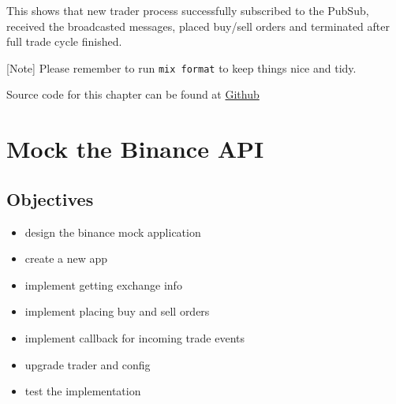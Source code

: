 \documentclass[
  oneside]{book}
\newenvironment{Shaded}{\begin{snugshade}}{\end{snugshade}}
\newcommand{\AttributeTok}[1]{\textcolor[rgb]{0.77,0.63,0.00}{#1}}
\newcommand{\CommentTok}[1]{\textcolor[rgb]{0.56,0.35,0.01}{\textit{#1}}}
\newcommand{\ErrorTok}[1]{\textcolor[rgb]{0.64,0.00,0.00}{\textbf{#1}}}
\newcommand{\ExtensionTok}[1]{#1}
\newcommand{\KeywordTok}[1]{\textcolor[rgb]{0.13,0.29,0.53}{\textbf{#1}}}
\newcommand{\NormalTok}[1]{#1}
\newcommand{\OperatorTok}[1]{\textcolor[rgb]{0.81,0.36,0.00}{\textbf{#1}}}
\newcommand{\StringTok}[1]{\textcolor[rgb]{0.31,0.60,0.02}{#1}}
\providecommand{\tightlist}{%
  \setlength{\itemsep}{0pt}\setlength{\parskip}{0pt}}
\begin{document}
\begin{Shaded}
\end{Shaded}

This shows that new trader process successfully subscribed to the PubSub, received the broadcasted messages, placed buy/sell orders and terminated after full trade cycle finished.

{[}Note{]} Please remember to run \texttt{mix\ format} to keep things nice and tidy.

Source code for this chapter can be found at \href{https://github.com/frathon/create-a-cryptocurrency-trading-bot-in-elixir-source-code/tree/chapter_03}{Github}

\hypertarget{mock-the-binance-api}{%
\chapter{Mock the Binance API}\label{mock-the-binance-api}}

\hypertarget{objectives-3}{%
\section{Objectives}\label{objectives-3}}

\begin{itemize}
\tightlist
\item
  design the binance mock application
\item
  create a new app
\item
  implement getting exchange info
\item
  implement placing buy and sell orders
\item
  implement callback for incoming trade events
\item
  upgrade trader and config
\item
  test the implementation
\end{itemize}
\end{document}
